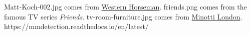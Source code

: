 \documentclass[UTF8]{ctexart}
\begin{document}
\begin{thebibliography}{9}
\bibitem{}
Matt-Koch-002.jpg comes from \href{https://westernhorseman.com/culture/road-stories/matt-koch-is-simply-cowboy/}{Western Horseman}.
\bibitem{}
friends.png comes from the famous TV series \textit{Friends}.
\bibitem{}
tv-room-furniture.jpg comes from \href{https://minottilondon.com/set-up-tv-room/}{Minotti London}.
\bibitem{}
https://mmdetection.readthedocs.io/en/latest/
\end{thebibliography}
\end{document}
